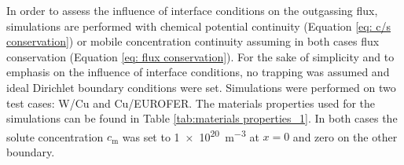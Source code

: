 In order to assess the influence of interface conditions on the outgassing flux, simulations are performed with chemical potential continuity (Equation \ref{eq: c/s conservation}) or mobile concentration continuity assuming in both cases flux conservation (Equation \ref{eq: flux conservation}).
For the sake of simplicity and to emphasis on the influence of interface conditions, no trapping was assumed and ideal Dirichlet boundary conditions were set.
Simulations were performed on two test cases: W/Cu and Cu/EUROFER.
The materials properties used for the simulations can be found in Table \ref{tab:materials properties_1}.
In both cases the solute concentration $c_\mathrm{m}$ was set to \SI{1e20}{m^{-3}} at $x=0$ and zero on the other boundary.




